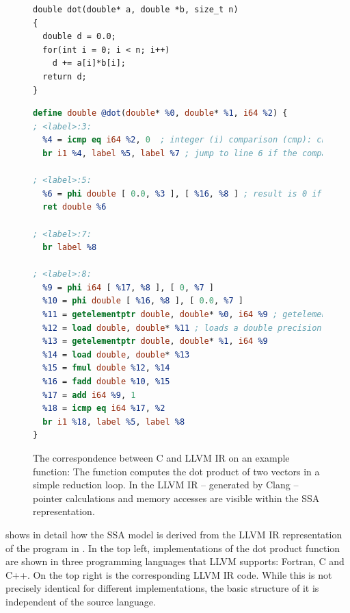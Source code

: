 \begin{figure}[p]
\vspace{-0.09cm}
\begin{lstlisting}[language=MyCpp,captionpos=t,title=
   {{\bf(a)} {} C source code of a {\tt dot} product function implementation:
    \leftskip=0pt}]
double dot(double* a, double *b, size_t n)
{
  double d = 0.0;
  for(int i = 0; i < n; i++)
    d += a[i]*b[i];
  return d;
}
\end{lstlisting}
\vspace{-0.09cm}
\begin{lstlisting}[language=LLVM,breaklines=true,captionpos=t,title=
   {{\bf(b)} {} LLVM IR representation of the same {\tt dot} product function:
    \leftskip=0pt}]
define double @dot(double* %0, double* %1, i64 %2) {
; <label>:3:
  %4 = icmp eq i64 %2, 0  ; integer (i) comparison (cmp): check if register %2 is equal (eq) to constant zero
  br i1 %4, label %5, label %7 ; jump to line 6 if the comparison held, otherwise jump to line 10 instead

; <label>:5:
  %6 = phi double [ 0.0, %3 ], [ %16, %8 ] ; result is 0 if the phi node was reached from line 4, otherwise it was reached from line 24 and the result is taken from %16
  ret double %6

; <label>:7:
  br label %8

; <label>:8:
  %9 = phi i64 [ %17, %8 ], [ 0, %7 ]
  %10 = phi double [ %16, %8 ], [ 0.0, %7 ]
  %11 = getelementptr double, double* %0, i64 %9 ; getelementpointer calculates memory addresses, here it computes the address of the %9-th value in the array %0
  %12 = load double, double* %11 ; loads a double precision floating point value from the calculated address
  %13 = getelementptr double, double* %1, i64 %9
  %14 = load double, double* %13
  %15 = fmul double %12, %14
  %16 = fadd double %10, %15
  %17 = add i64 %9, 1
  %18 = icmp eq i64 %17, %2
  br i1 %18, label %5, label %8
}
\end{lstlisting}
\caption{The correspondence between C and LLVM IR on an example function:
         The function computes the dot product of two vectors in a simple
         reduction loop.
         In the LLVM IR -- generated by Clang -- pointer calculations and memory
         accesses are visible within the SSA representation.}
\label{llvmirexample}
\end{figure}

     shows in detail how the SSA model is derived from the
    LLVM IR representation of the program in .
    In the top left, implementations of the dot product function are shown
    in three programming languages that LLVM supports: Fortran, C and C++.
    On the top right is the corresponding LLVM IR code.
    While this is not precisely identical for different implementations,
    the basic structure of it is independent of the source language.

